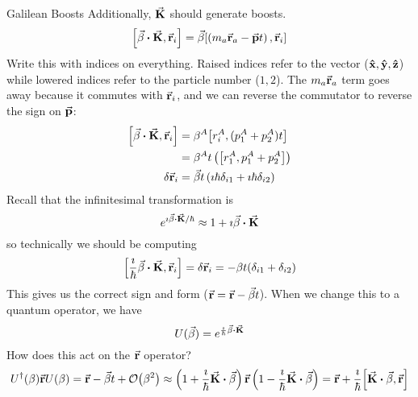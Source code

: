\documentclass[a4paper,twoside,master.tex]{subfiles}
\begin{document}
\begin{note}{Galilean Boosts}
    Additionally, $ \va{K} $ should generate boosts.
    \begin{equation}
        \comm{\va{\beta} \vdot \va{K}}{\va{r}_i} = \va{\beta} \comm{\left( m_a \va{r}_a - \va{p} t \right)}{\va{r}_i}
    \end{equation}
    Write this with indices on everything. Raised indices refer to the vector ($ \vu{x}, \vu{y}, \vu{z} $) while lowered indices refer to the particle number ($ 1, 2 $). The $ m_a \va{r}_a $ term goes away because it commutes with $ \va{r}_i $, and we can reverse the commutator to reverse the sign on $ \va{p} $:
    \begin{align}
        \comm{\va{\beta} \vdot \va{K}}{\va{r}_i} &= \beta^A \comm{r_i^A}{(p_1^A + p_2^A)t} \\
        &= \beta^A t \left( \comm{r_1^A}{p_1^A + p_2^A} \right) \\
        \delta \va{r}_i &= \va{\beta} t \left( \imath \hbar \delta_{i1} + \imath \hbar \delta_{i2} \right)
    \end{align}
    Recall that the infinitesimal transformation is
    \begin{equation}
        e^{\imath \va{\beta} \vdot \va{K} / \hbar} \approx 1 + \imath \va{\beta} \vdot \va{K}
    \end{equation}
    so technically we should be computing
    \begin{equation}
        \comm{ \frac{\imath}{\hbar} \va{\beta} \vdot \va{K}}{\va{r}_i} = \delta \va{r}_i = - \beta t(\delta_{i1} + \delta_{i2})
    \end{equation}
    This gives us the correct sign and form ($ \va{r} = \va{r} - \va{\beta} t $). When we change this to a quantum operator, we have
    \begin{equation}
        U(\va{\beta}) = e^{\frac{\imath}{\hbar} \va{\beta} \vdot \va{K}}
    \end{equation}
    How does this act on the $ \va{r} $ operator?
    \begin{equation}
        U^\dagger(\beta) \va{r} U(\beta) = \va{r} - \va{\beta} t + \order{\beta^2} \approx \left( 1 + \frac{\imath}{\hbar} \va{K} \vdot \va{\beta} \right) \va{r} \left( 1 - \frac{\imath}{\hbar} \va{K} \vdot \va{\beta} \right) = \va{r} + \frac{\imath}{\hbar} \comm{\va{K} \vdot \va{\beta}}{\va{r}}
    \end{equation}
\end{note}
\end{document}
